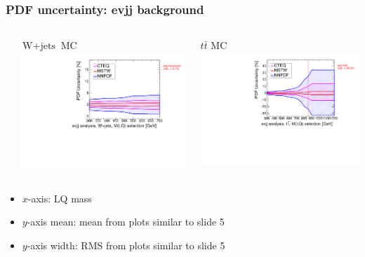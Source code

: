 \documentclass[bigger]{beamer}
\begin{document}
\begin{frame}
\frametitle{PDF uncertainty: evjj background}
\label{sec-3-1-5}
\begin{columns} %
\label{sec-3-1-5-1}
\begin{column}{0.55\textwidth}
\label{sec-3-1-5-1-1}

\centering
$\text{W}+\text{jets}$ MC
\includegraphics[width=\textwidth]{fig/WJet_Madgraph_enujj_envelope.pdf}
\end{column}
\begin{column}{0.55\textwidth}
\label{sec-3-1-5-1-2}

\centering
$t\bar{t}$ MC
\includegraphics[width=\textwidth]{fig/TTbar_Madgraph_enujj_envelope.pdf}
\end{column}
\end{columns}
\label{sec-3-1-5-2}

\centering
\begin{itemize}

\item $x$-axis: LQ mass
\label{sec-3-1-5-2-1}%

\item $y$-axis mean: mean from plots similar to slide 5
\label{sec-3-1-5-2-2}%

\item $y$-axis width: RMS from plots similar to slide 5
\label{sec-3-1-5-2-3}%

\end{itemize} %
\end{frame}
\end{document}
